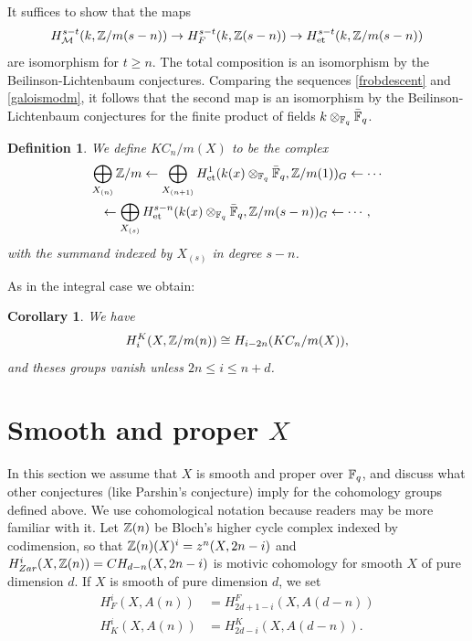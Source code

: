 \documentclass[nospthms,envcountsect]{svmult} %
\newtheorem{corollary}  [theorem]       {Corollary}
\newtheorem{definition} [theorem]       {Definition}
\begin{document}
\proof
It suffices to show that the maps 
$$H^{s-t}_{\mathcal M}(k,{{\mathbb Z}}/m(s-n))\to H^{s-t}_F(k,{{\mathbb Z}}(s-n))
\to H^{s-t}_{\text{\rm et}}(k,{{\mathbb Z}}/m(s-n))$$
are isomorphism for $t\geq n$. The total composition is an isomorphism 
by the Beilinson-Lichtenbaum conjectures. Comparing the
sequences \eqref{frobdescent} and \eqref{galoismodm},
it follows that the second map
is an isomorphism by the Beilinson-Lichtenbaum conjectures
for the finite product of fields $k\otimes_{{{\mathbb F}}_q}\bar{{{\mathbb F}}}_q$.
\proofend


\begin{definition}
We define $KC_n/m(X)$ to be the complex 
\begin{multline}\label{kkk}
\bigoplus_{X_{(n)}} {{\mathbb Z}}/m \gets 
\bigoplus_{X_{(n+1)}} H^1_{\text{\rm et}}(k(x)\otimes_{{{\mathbb F}}_q}\bar{{{\mathbb F}}}_q,{{\mathbb Z}}/m(1))_G \gets
\cdots \\ \gets 
\bigoplus_{X_{(s)}} H^{s-n}_{\text{\rm et}}(k(x)\otimes_{{{\mathbb F}}_q}\bar{{{\mathbb F}}}_q,{{\mathbb Z}}/m(s-n))_G
\gets\cdots,
\end{multline}
with the summand indexed by $X_{(s)}$ in degree $s-n$.
\end{definition}

As in the integral case we obtain:

\begin{corollary}
We have 
$$H_i^K(X,{{\mathbb Z}}/m(n))\cong H_{i-2n}(KC_n/m(X)),$$
and theses groups vanish unless $2n\leq i\leq n+d$.
\end{corollary}







\section{Smooth and proper $X$}
In this section we assume that $X$ is smooth and proper
over ${{\mathbb F}}_q$, and discuss what other conjectures (like
Parshin's conjecture) imply for the cohomology groups
defined above. We use cohomological notation because
readers may be more familiar with it. 
Let ${{\mathbb Z}}(n)$ be Bloch's higher
cycle complex indexed by codimension, so that ${{\mathbb Z}}(n)(X)^i=z^n(X,2n-i)$
and $H^{i}_{Zar}(X,{{\mathbb Z}}(n))=CH_{d-n}(X,2n-i)$ is motivic cohomology for 
smooth $X$ of pure dimension $d$.
If $X$ is smooth of pure dimension $d$, we set
\begin{align}\label{definecohom}
H^i_F(X,A(n))&=H_{2d+1-i}^F(X,A(d-n))\\
H^i_K(X,A(n))&=H_{2d-i}^K(X,A(d-n)).
\end{align}
\end{document}
